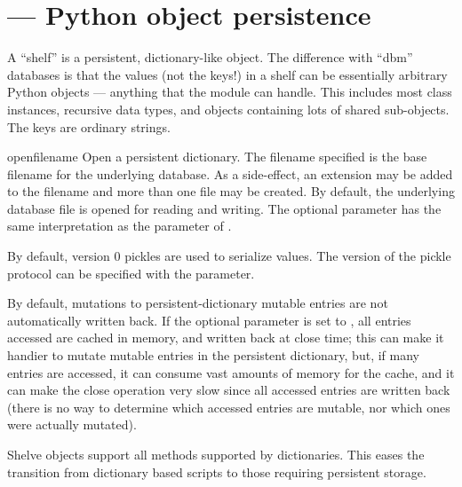 \section{ ---
         Python object persistence}



A ``shelf'' is a persistent, dictionary-like object.  The difference
with ``dbm'' databases is that the values (not the keys!) in a shelf
can be essentially arbitrary Python objects --- anything that the
 module can handle.  This includes most class
instances, recursive data types, and objects containing lots of shared 
sub-objects.  The keys are ordinary strings.

\begin{funcdesc}{open}{filename}
Open a persistent dictionary.  The filename specified is the base filename
for the underlying database.  As a side-effect, an extension may be added to
the filename and more than one file may be created.  By default, the
underlying database file is opened for reading and writing.  The optional
{} parameter has the same interpretation as the 
parameter of .  

By default, version 0 pickles are used to serialize values. 
The version of the pickle protocol can be specified with the
 parameter. 

By default, mutations to persistent-dictionary mutable entries are not
automatically written back.  If the optional  parameter
is set to {}, all entries accessed are cached in memory, and
written back at close time; this can make it handier to mutate mutable
entries in the persistent dictionary, but, if many entries are
accessed, it can consume vast amounts of memory for the cache, and it
can make the close operation very slow since all accessed entries are
written back (there is no way to determine which accessed entries are
mutable, nor which ones were actually mutated).

\end{funcdesc}

Shelve objects support all methods supported by dictionaries.  This eases
the transition from dictionary based scripts to those requiring persistent
storage.

